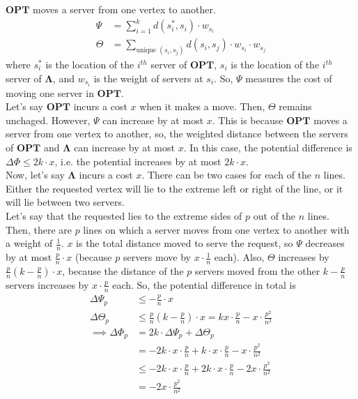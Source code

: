 \documentclass[11pt]{article}
\begin{document}
$\mathbf{OPT}$ moves a server from one vertex to another.
\begin{align}
    \Psi &= \sum_{i=1}^{k} d(s_{i}^{*}, s_{i}) \cdot w_{s_{i}} \\
    \Theta &= \sum_{\text{unique } (s_{i}, s_{j})} d(s_{i}, s_{j}) \cdot w_{s_{i}} \cdot w_{s_{j}}
\end{align}
where $s_{i}^{*}$ is the location of the $i^{th}$ server of $\mathbf{OPT}$, $s_{i}$ is the location of the $i^{th}$ server of $\mathbf{\Lambda}$,
and $w_{s_{i}}$ is the weight of servers at $s_{i}$. So, $\Psi$ measures the cost of moving one server in $\mathbf{OPT}$. \\
Let's say $\mathbf{OPT}$ incurs a cost $x$ when it makes a move. Then, $\Theta$ remains unchaged. However,
$\Psi$ can increase by at most $x$. This is because $\mathbf{OPT}$ moves a server from one vertex to another, so, the
weighted distance between the servers of $\mathbf{OPT}$ and $\mathbf{\Lambda}$ can increase by at most $x$. In this case,
the potential difference is $\Delta \Phi \leq 2k \cdot x$, i.e. the potential increases by at most $2k \cdot x$. \\
Now, let's say $\mathbf{\Lambda}$ incurs a cost $x$. There can be two cases for each of the $n$ lines. Either the requested
vertex will lie to the extreme left or right of the line, or it will lie between two servers. \\
Let's say that the requested
lies to the extreme sides of $p$ out of the $n$ lines. Then, there are $p$ lines on which a server moves from one vertex to
another with a weight of $\frac{1}{n}$. $x$ is the total distance moved to serve the request, so $\Psi$ decreases by at most
$\frac{p}{n} \cdot x$ (because $p$ servers move by $x \cdot \frac{1}{n}$ each). Also, $\Theta$ increases by $\frac{p}{n} (k - \frac{p}{n}) \cdot x$,
because the distance of the $p$ servers moved from the other $k - \frac{p}{n}$ servers increases by $x \cdot \frac{p}{n}$ each. So, the potential
difference in total is
\begin{align}
    \Delta \Psi_{p} &\leq -\frac{p}{n} \cdot x \\
    \Delta \Theta_{p} &\leq \frac{p}{n} \left( k - \frac{p}{n} \right) \cdot x = k x \cdot \frac{p}{n} - x \cdot \frac{p^{2}}{n^{2}} \\
    \implies \Delta \Phi_{p} &= 2k \cdot \Delta \Psi_{p} + \Delta \Theta_{p} \\
    &= -2k \cdot x \cdot \frac{p}{n} + k \cdot x \cdot \frac{p}{n} - x \cdot \frac{p^{2}}{n^{2}} \\
    &\leq -2k \cdot x \cdot \frac{p}{n} + 2k \cdot x \cdot \frac{p}{n} - 2x \cdot \frac{p^{2}}{n^{2}} \\ %
    \label{eq:diff-1}
    &= -2x \cdot \frac{p^{2}}{n^{2}}
\end{align}
\end{document}
